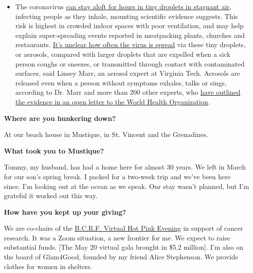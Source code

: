 \begin{itemize}
  \begin{itemize}
  \tightlist
  \item
    The coronavirus
    \href{https://www.nytimes.com/2020/07/04/health/239-experts-with-one-big-claim-the-coronavirus-is-airborne.html?action=click\&pgtype=Article\&state=default\&region=MAIN_CONTENT_3\&context=storylines_faq}{can
    stay aloft for hours in tiny droplets in stagnant air}, infecting
    people as they inhale, mounting scientific evidence suggests. This
    risk is highest in crowded indoor spaces with poor ventilation, and
    may help explain super-spreading events reported in meatpacking
    plants, churches and restaurants.
    \href{https://www.nytimes.com/2020/07/06/health/coronavirus-airborne-aerosols.html?action=click\&pgtype=Article\&state=default\&region=MAIN_CONTENT_3\&context=storylines_faq}{It's
    unclear how often the virus is spread} via these tiny droplets, or
    aerosols, compared with larger droplets that are expelled when a
    sick person coughs or sneezes, or transmitted through contact with
    contaminated surfaces, said Linsey Marr, an aerosol expert at
    Virginia Tech. Aerosols are released even when a person without
    symptoms exhales, talks or sings, according to Dr. Marr and more
    than 200 other experts, who
    \href{https://academic.oup.com/cid/article/doi/10.1093/cid/ciaa939/5867798}{have
    outlined the evidence in an open letter to the World Health
    Organization}.
  \end{itemize}
\end{itemize}

\textbf{Where are you hunkering down?}

At our beach house in Mustique, in St. Vincent and the Grenadines.

\textbf{What took you to Mustique?}

Tommy, my husband, has had a home here for almost 30 years. We left in
March for our son's spring break. I packed for a two-week trip and we've
been here since. I'm looking out at the ocean as we speak. Our stay
wasn't planned, but I'm grateful it worked out this way.

\textbf{How have you kept up your giving?}

We are co-chairs of the \href{https://www.bcrf.org}{B.C.R.F. Virtual Hot
Pink Evening} in support of cancer research. It was a Zoom situation, a
new frontier for me. We expect to raise substantial funds. {[}The May 20
virtual gala brought in \$5.2 million{]}. I'm also on the board of
Glam4Good, founded by my friend Alice Stephenson. We provide clothes for
women in shelters.

